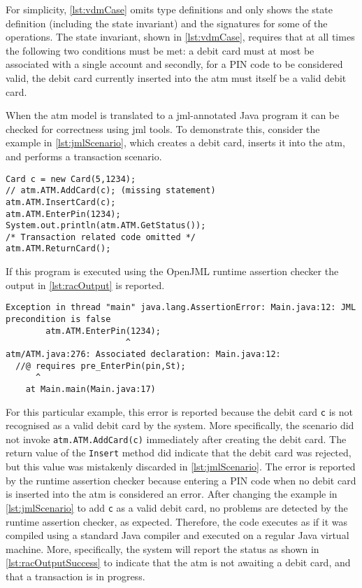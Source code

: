 For simplicity, \autoref{lst:vdmCase} omits type definitions and only
shows the state definition (including the state invariant) and the
signatures for some of the operations. The state invariant, shown in
\autoref{lst:vdmCase}, requires that at all times the following two
conditions must be met: a debit card must at most be associated with a
single account and secondly, for a PIN code to be considered valid,
the debit card currently inserted into the \ac{atm} must itself be a
valid debit card.

When the \ac{atm} model is translated to a \ac{jml}-annotated Java
program it can be checked for correctness using \ac{jml} tools. To
demonstrate this, consider the example in \autoref{lst:jmlScenario},
which creates a debit card, inserts it into the \ac{atm}, and performs
a transaction scenario.

\begin{lstlisting}[style=customJml,caption={Java code demonstrating
use of the implementation of the \ac{atm}
model.},label={lst:jmlScenario}]
Card c = new Card(5,1234);
// atm.ATM.AddCard(c); (missing statement)
atm.ATM.InsertCard(c);
atm.ATM.EnterPin(1234);
System.out.println(atm.ATM.GetStatus());
/* Transaction related code omitted */
atm.ATM.ReturnCard();
\end{lstlisting}

If this program is executed using the OpenJML runtime assertion
checker the output in \autoref{lst:racOutput} is reported.

\begin{lstlisting}[style=racOutput,caption={Inconsistent use of the
system detected using the OpenJML runtime assertion
checker.},label={lst:racOutput}]
Exception in thread "main" java.lang.AssertionError: Main.java:12: JML precondition is false
        atm.ATM.EnterPin(1234);
                        ^
atm/ATM.java:276: Associated declaration: Main.java:12: 
  //@ requires pre_EnterPin(pin,St);
      ^
	at Main.main(Main.java:17)
\end{lstlisting}

For this particular example, this error is reported because the debit
card \texttt{c} is not recognised as a valid debit card by the
system. More specifically, the scenario did not invoke
\texttt{atm.ATM.AddCard(c)} immediately after creating the debit
card. The return value of the \texttt{Insert} method did indicate that
the debit card was rejected, but this value was mistakenly discarded
in \autoref{lst:jmlScenario}. The error is reported by the runtime
assertion checker because entering a PIN code when no debit card is
inserted into the \ac{atm} is considered an error. After changing the
example in \autoref{lst:jmlScenario} to add \texttt{c} as a valid
debit card, no problems are detected by the runtime assertion checker,
as expected. Therefore, the code executes as if it was compiled using
a standard Java compiler and executed on a regular Java virtual
machine. More, specifically, the system will report the status as
shown in \autoref{lst:racOutputSuccess} to indicate that the \ac{atm}
is not awaiting a debit card, and that a transaction is in progress.

